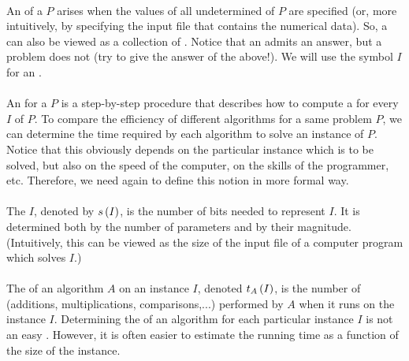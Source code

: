 \paragraph{}
An  of a  $P$ arises when the values of all undetermined  of $P$ are specified (or, more intuitively, by specifying the input file that contains the numerical data). So, a  can also be viewed as a collection of . Notice that an  admits an answer, but a problem does not (try to give the answer of the  above!). We will use the symbol $I$ for an .

\paragraph{}
An  for a  $P$ is a step-by-step procedure that describes how to compute a  for every  $I$ of $P$. To compare the efficiency of different algorithms for a same problem $P$, we can determine the time required by each algorithm to solve an instance of $P$. Notice that this obviously depends on the particular instance which is to be solved, but also on the speed of the computer, on the skills of the programmer, etc. Therefore, we need again to define this notion in more formal way.

\paragraph{}
The  $I$, denoted by $s\left( I \right)$, is the number of bits needed to represent $I$. It is determined both by the number of parameters and by their magnitude. (Intuitively, this can be viewed as the size of the input file of a computer program which solves $I$.)

\paragraph{}
The  of an algorithm $A$ on an instance $I$, denoted $t_A\left( I \right)$, is the number of  (additions, multiplications, comparisons,...) performed by $A$ when it runs on the instance $I$. Determining the  of an algorithm for each particular instance $I$ is not an easy . However, it is often easier to estimate the running time as a function of the size of the instance.

